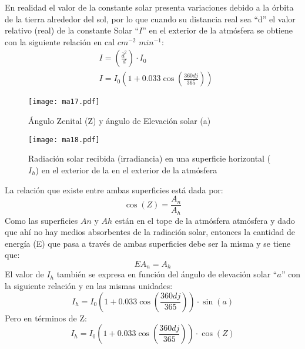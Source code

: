 En realidad el valor de la constante solar presenta variaciones debido a la órbita de la tierra alrededor del sol, por lo que cuando su distancia real sea ``d'' el valor relativo (real) de la constante Solar ``$I$'' en el exterior de la atmósfera se obtiene con la siguiente relación en cal $cm^{-2}$ $min^{-1}$:
\begin{align}
    &I = \left(\frac{\bar{d}^2}{d}\right)\cdot I_0\\
    &I = I_0\left(1 +0.033 \cos{\left(\frac{360dj}{365}\right)}  \right)
\end{align}
\begin{figure}[h!]
\centering
  \texttt{[image: ma17.pdf]}
  \caption{Ángulo Zenital (Z) y ángulo de Elevación solar (a)}
  \label{ma17}
\end{figure}
\begin{figure}[h!]
\centering
  \texttt{[image: ma18.pdf]}
  \caption{Radiación solar recibida (irradiancia) en una superficie horizontal ($I_h$) en el exterior de la en el exterior de la atmósfera}
  \label{ma18}
\end{figure}
La relación que existe entre ambas superficies está dada por:
\begin{equation}
    \cos{(Z)} = \frac{A_n}{A_h} 
\end{equation}
Como las superficies $An$ y $Ah$ están en el tope de la atmósfera atmósfera y dado que ahí no hay medios absorbentes de la radiación solar, entonces la cantidad de energía (E) que pasa a través de ambas superficies debe ser la misma y se tiene que:
\begin{equation}
    EA_n = A_h
\end{equation}
El valor de $I_h$ también se expresa en función del ángulo de elevación solar ``$a$'' con la siguiente relación y en las mismas unidades:
\begin{equation}
    I_h = I_0\left(1 +0.033 \cos{\left(\frac{360dj}{365}\right)}\right)\cdot \sin{(a)} 
\end{equation}
Pero en términos de Z:
\begin{equation}
    I_h = I_0\left(1 +0.033 \cos{\left(\frac{360dj}{365}\right)}\right)\cdot \cos{(Z)} 
\end{equation}

